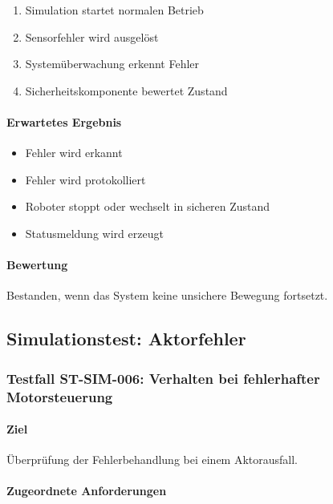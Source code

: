 \begin{enumerate}
\def\labelenumi{\arabic{enumi}.}
\tightlist
\item
  Simulation startet normalen Betrieb
\item
  Sensorfehler wird ausgelöst
\item
  Systemüberwachung erkennt Fehler
\item
  Sicherheitskomponente bewertet Zustand
\end{enumerate}

\paragraph{Erwartetes Ergebnis}\label{erwartetes-ergebnis-20}

\begin{itemize}
\tightlist
\item
  Fehler wird erkannt
\item
  Fehler wird protokolliert
\item
  Roboter stoppt oder wechselt in sicheren Zustand
\item
  Statusmeldung wird erzeugt
\end{itemize}

\paragraph{Bewertung}\label{bewertung-20}

Bestanden, wenn das System keine unsichere Bewegung fortsetzt.

\subsection{Simulationstest:
Aktorfehler}\label{simulationstest-aktorfehler}

\subsubsection{Testfall ST-SIM-006: Verhalten bei fehlerhafter
Motorsteuerung}\label{testfall-st-sim-006-verhalten-bei-fehlerhafter-motorsteuerung}

\paragraph{Ziel}\label{ziel-21}

Überprüfung der Fehlerbehandlung bei einem Aktorausfall.

\paragraph{Zugeordnete
Anforderungen}\label{zugeordnete-anforderungen-21}

